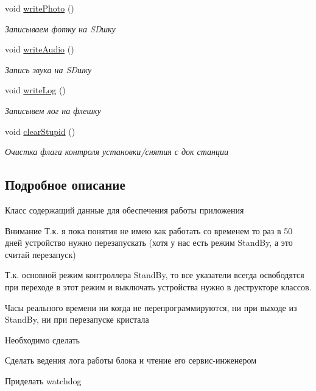 \begin{DoxyCompactItemize}
\mbox{\label{classapp_1_1_t_application_a2976114a4d6cb5ae83b28459e7a2aa70}} 
void \hyperlink{classapp_1_1_t_application_a2976114a4d6cb5ae83b28459e7a2aa70}{write\+Photo} ()
\begin{DoxyCompactList}\small\item\em Записываем фотку на SD\textquotesingle{}шку \end{DoxyCompactList}\item 
\mbox{\label{classapp_1_1_t_application_ab70622395a7d982ea5f5f53f7cce86c6}} 
void \hyperlink{classapp_1_1_t_application_ab70622395a7d982ea5f5f53f7cce86c6}{write\+Audio} ()
\begin{DoxyCompactList}\small\item\em Запись звука на SD\textquotesingle{}шку \end{DoxyCompactList}\item 
void \hyperlink{classapp_1_1_t_application_a8c4bf0b62709ad4abd9c9027f1f58106}{write\+Log} ()
\begin{DoxyCompactList}\small\item\em Записывем лог на флешку \end{DoxyCompactList}\item 
void \hyperlink{classapp_1_1_t_application_aaa44a223c18f6087f10eb9bae637b90c}{clear\+Stupid} ()
\begin{DoxyCompactList}\small\item\em Очистка флага контроля установки/снятия с док станции \end{DoxyCompactList}\end{DoxyCompactItemize}


\subsection{Подробное описание}
Класс содержащий данные для обеспечения работы приложения 

\begin{DoxyAttention}{Внимание}
Т.\+к. я пока понятия не имею как работать со временем то раз в 50 дней устройство нужно перезапускать (хотя у нас есть режим Stand\+By, а это считай перезапуск) 

Т.\+к. основной режим контроллера Stand\+By, то все указатели всегда освободятся при переходе в этот режим и выключать устройства нужно в деструкторе классов. 

Часы реального времени ни когда не перепрограммируются, ни при выходе из Stand\+By, ни при перезапуске кристала 
\end{DoxyAttention}
\begin{DoxyRefDesc}{Необходимо сделать}
\item[\hyperlink{todo__todo000004}{Необходимо сделать}]Сделать ведения лога работы блока и чтение его сервис-\/инженером 

Приделать watchdog \end{DoxyRefDesc}


